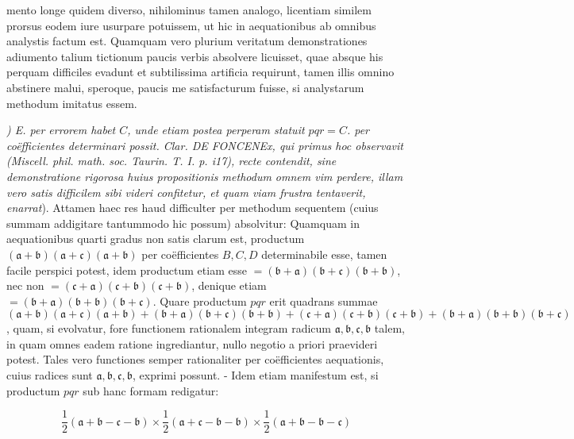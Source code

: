 \documentclass[10pt]{article}
\begin{document}
mento longe quidem diverso, nihilominus tamen analogo, licentiam similem prorsus eodem iure usurpare potuissem, ut hic in aequationibus ab omnibus analystis factum est. Quamquam vero plurium veritatum demonstrationes adiumento talium tictionum paucis verbis absolvere licuisset, quae absque his perquam difficiles evadunt et subtilissima artificia requirunt, tamen illis omnino abstinere malui, speroque, paucis me satisfacturum fuisse, si analystarum methodum imitatus essem.

\textit{) E. per errorem habet \(C\), unde etiam postea perperam statuit \(p q r=C\).
per coëfficientes determinari possit. Clar. DE FONCENEx, qui primus hoc observavit (Miscell. phil. math. soc. Taurin. T. I. p. i17), recte contendit, sine demonstratione rigorosa huius propositionis methodum omnem vim perdere, illam vero satis difficilem sibi videri confitetur, et quam viam frustra tentaverit, enarrat}). Attamen haec res haud difficulter per methodum sequentem (cuius summam addigitare tantummodo hic possum) absolvitur: Quamquam in aequationibus quarti gradus non satis clarum est, productum \((\mathfrak{a}+\mathfrak{b})(\mathfrak{a}+\mathfrak{c})(\mathfrak{a}+\mathfrak{b})\) per coëfficientes \(B, C, D\) determinabile esse, tamen facile perspici potest, idem productum etiam esse \(=(\mathfrak{b}+\mathfrak{a})(\mathfrak{b}+\mathfrak{c})(\mathfrak{b}+\mathfrak{b})\), nec non \(=(\mathfrak{c}+\mathfrak{a})(\mathfrak{c}+\mathfrak{b})(\mathfrak{c}+\mathfrak{b})\), denique etiam \(=(\mathfrak{b}+\mathfrak{a})(\mathfrak{b}+\mathfrak{b})(\mathfrak{b}+\mathfrak{c})\). Quare productum \(p q r\) erit quadrans summae \((\mathfrak{a}+\mathfrak{b})(\mathfrak{a}+\mathfrak{c})(\mathfrak{a}+\mathfrak{b})+(\mathfrak{b}+\mathfrak{a})(\mathfrak{b}+\mathfrak{c})(\mathfrak{b}+\mathfrak{b})+(\mathfrak{c}+\mathfrak{a})(\mathfrak{c}+\mathfrak{b})(\mathfrak{c}+\mathfrak{b})+(\mathfrak{b}+\mathfrak{a})(\mathfrak{b}+\mathfrak{b})(\mathfrak{b}+\mathfrak{c})\), quam, si evolvatur, fore functionem rationalem integram radicum \(\mathfrak{a}, \mathfrak{b}, \mathfrak{c}, \mathfrak{b}\) talem, in quam omnes eadem ratione ingrediantur, nullo negotio a priori praevideri potest. Tales vero functiones semper rationaliter per coëfficientes aequationis, cuius radices sunt \(\mathfrak{a}, \mathfrak{b}, \mathfrak{c}, \mathfrak{b}\), exprimi possunt. - Idem etiam manifestum est, si productum \(p q r\) sub hanc formam redigatur:

\[
\frac{1}{2}(\mathfrak{a}+\mathfrak{b}-\mathfrak{c}-\mathfrak{b}) \times \frac{1}{2}(\mathfrak{a}+\mathfrak{c}-\mathfrak{b}-\mathfrak{b}) \times \frac{1}{2}(\mathfrak{a}+\mathfrak{b}-\mathfrak{b}-\mathfrak{c})
\]
\end{document}
